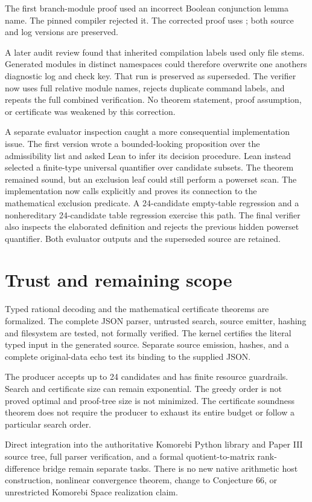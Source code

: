 The first branch-module proof used an incorrect Boolean conjunction lemma name. The pinned compiler rejected it. The corrected proof uses ; both source and log versions are preserved.

A later audit review found that inherited compilation labels used only file stems. Generated modules in distinct namespaces could therefore overwrite one another\textquotesingle s diagnostic log and check key. That run is preserved as superseded. The verifier now uses full relative module names, rejects duplicate command labels, and repeats the full combined verification. No theorem statement, proof assumption, or certificate was weakened by this correction.

A separate evaluator inspection caught a more consequential implementation issue. The first version wrote a bounded-looking proposition over the admissibility list and asked Lean to infer its decision procedure. Lean instead selected a finite-type universal quantifier over candidate subsets. The theorem remained sound, but an exclusion leaf could still perform a powerset scan. The implementation now calls  explicitly and proves its connection to the mathematical exclusion predicate. A 24-candidate empty-table regression and a nonhereditary 24-candidate table regression exercise this path. The final verifier also inspects the elaborated definition and rejects the previous hidden powerset quantifier. Both evaluator outputs and the superseded source are retained.

\section{Trust and remaining scope}

Typed rational decoding and the mathematical certificate theorems are formalized. The complete JSON parser, untrusted search, source emitter, hashing and filesystem are tested, not formally verified. The kernel certifies the literal typed input in the generated source. Separate source emission, hashes, and a complete original-data echo test its binding to the supplied JSON.

The producer accepts up to 24 candidates and has finite resource guardrails. Search and certificate size can remain exponential. The greedy order is not proved optimal and proof-tree size is not minimized. The certificate soundness theorem does not require the producer to exhaust its entire budget or follow a particular search order.

Direct integration into the authoritative Komorebi Python library and Paper III source tree, full parser verification, and a formal quotient-to-matrix rank-difference bridge remain separate tasks. There is no new native arithmetic host construction, nonlinear convergence theorem, change to Conjecture 66, or unrestricted Komorebi Space realization claim.

